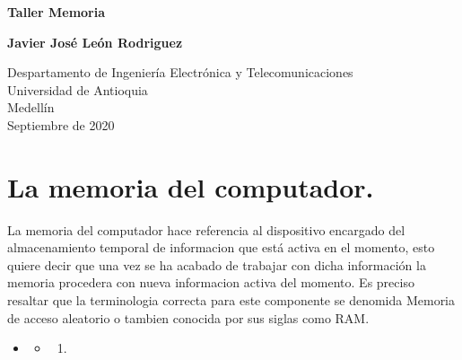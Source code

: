 \documentclass[12pt]{article}
\begin{document}
\begin{titlepage}
    \begin{center}
        \vspace*{1cm}
            
        \Huge
        
        \textbf{Taller Memoria}
            
        \vspace{0.5cm}
        \LARGE
    
            
        \vspace{3cm}
            
        \textbf{Javier José León Rodriguez}
            
        \vfill
            
        \vspace{0.8cm}
            
        \Large
        Despartamento de Ingeniería Electrónica y Telecomunicaciones\\
        Universidad de Antioquia\\
        Medellín\\
        Septiembre de 2020
            
    \end{center}
\end{titlepage}

\tableofcontents

\section{La memoria del computador.}
La memoria del computador hace referencia al dispositivo encargado del almacenamiento temporal de informacion que está activa en el momento, esto quiere decir que una vez se ha acabado de trabajar con dicha información la memoria procedera con nueva informacion activa del momento. Es preciso resaltar que la terminologia correcta para este componente se denomida Memoria de acceso aleatorio o tambien conocida por sus siglas como RAM. 
\begin{itemize}
\item 
\begin{itemize}
\item 
\begin{enumerate}
\item 
\end{enumerate}
\end{itemize}
\end{itemize}
 \vspace{0.5cm}
 
\end{document}
